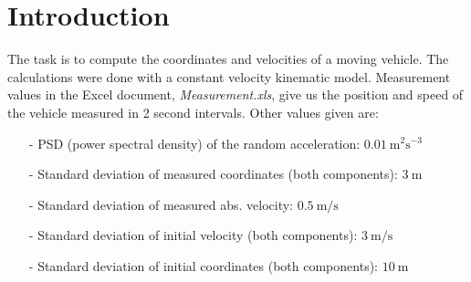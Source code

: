 
\section{Introduction} 

\label{sec:introduction}  The task is to compute the coordinates and velocities of a moving vehicle.  The calculations were done with a constant velocity kinematic model.  Measurement values in the Excel document, \emph{Measurement.xls}, give us the position and speed of the vehicle measured in 2 second intervals.  Other values given are:
\begin{itemize}
	\item[-]PSD (power spectral density) of the random acceleration: $0.01~\mathrm{m}^2\mathrm{s}^{−3}$
	\item[-]Standard deviation of measured coordinates (both components): $3~\mathrm{m}$
	\item[-]Standard deviation of measured abs. velocity: $0.5~\mathrm{m}/\mathrm{s}$
	\item[-]Standard deviation of initial velocity (both components): $3~\mathrm{m}/\mathrm{s}$
	\item[-]Standard deviation of initial coordinates (both components): $10~\mathrm{m}$
\end{itemize}


